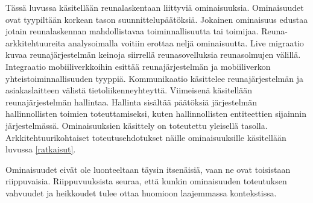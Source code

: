 \documentclass[finnish]{tktltiki2}
\theoremstyle{definition}
\theoremstyle{remark}
\begin{document}
Tässä luvussa käsitellään reunalaskentaan liittyviä ominaisuuksia.
Ominaisuudet ovat tyypiltään korkean tason suunnittelupäätöksiä. 
Jokainen ominaisuus edustaa jotain reunalaskennan mahdollistavaa toiminnallisuutta tai toimijaa.
Reuna-arkkitehtuureita analysoimalla voitiin erottaa neljä ominaisuutta.
Live migraatio kuvaa reunajärjestelmän keinoja siirrellä reunasovelluksia reunasolmujen välillä.
Integraatio mobiiliverkkoihin esittää reunajärjestelmän ja mobiiliverkon yhteistoiminnallisuuden tyyppiä. 
Kommunikaatio käsittelee reunajärjestelmän ja asiakaslaitteen välistä tietoliikenneyhteyttä. 
Viimeisenä käsitellään reunajärjestelmän hallintaa. Hallinta sisältää päätöksiä järjestelmän hallinnollisten toimien toteuttamiseksi, kuten hallinnollisten entiteettien sijainnin järjestelmässä.
Ominaisuuksien käsittely on toteutettu yleisellä tasolla.
Arkkitehtuurikohtaiset toteutusehdotukset näille ominaisuuksille käsitellään luvussa \ref{ratkaisut}.

Ominaisuudet eivät ole luonteeltaan täysin itsenäisiä, vaan ne ovat toisistaan riippuvaisia. Riippuvuuksista seuraa, että kunkin ominaisuuden toteutuksen vahvuudet ja heikkoudet tulee ottaa huomioon laajemmassa kontekstissa. 
\end{document}
